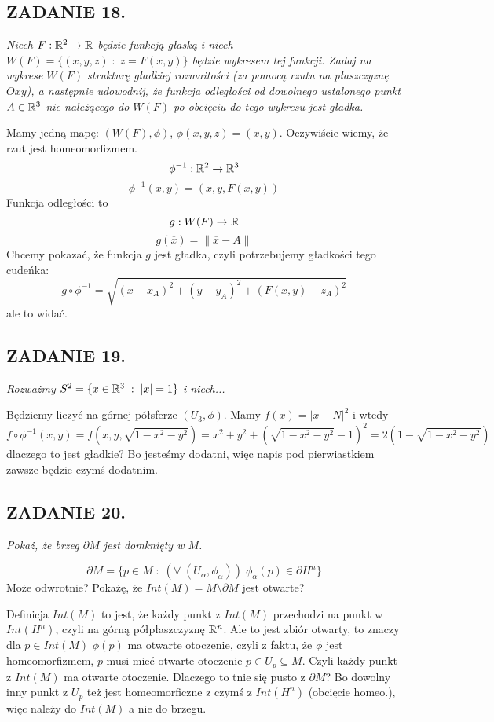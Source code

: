 \subsection*{ZADANIE 18.}
\emph{\color{pink}Niech $F:\mathbb{R}^2\to\mathbb{R}$ będzie funkcją głaską i niech $W(F)=\{(x, y,z)\;:\;z=F(x,y)\}$ będzie wykresem tej funkcji. Zadaj na wykrese $W(F)$ strukturę gładkiej rozmaitości (za pomocą rzutu na płaszczyznę $Oxy$), a następnie udowodnij, że funkcja odległości od dowolnego ustalonego punkt $A\in\mathbb{R}^3$ nie należącego do $W(F)$ po obcięciu do tego wykresu jest gładka.}
\smallskip

Mamy jedną mapę: $(W(F),\phi)$, $\phi(x,y,z)=(x,y)$. Oczywiście wiemy, że rzut jest homeomorfizmem.
$$\phi^{-1}:\mathbb{R}^2\to \mathbb{R}^3$$
$$\phi^{-1}(x,y)=(x,y,F(x,y))$$
Funkcja odległości to
$$g:W(F)\to\mathbb{R}$$
$$g(\overline x)=\|\overline x-A\|$$
Chcemy pokazać, że funkcja $g$ jest gładka, czyli potrzebujemy gładkości tego cudeńka:
$$g\circ \phi^{-1}=\sqrt{(x-x_A)^2+(y-y_A)^2+(F(x,y)-z_A)^2}$$
ale to widać.

\subsection*{ZADANIE 19.}
\emph{\color{pink}Rozważmy $S^2=\{x\in\mathbb{R}^3\;:\;|x|=1\}$ i niech...}
\smallskip

Będziemy liczyć na górnej półsferze $(U_3,\phi)$. Mamy $f(x)=|x-N|^2$ i wtedy
$$f\circ\phi^{-1}(x, y)=f(x, y, \sqrt{1-x^2-y^2})=x^2+y^2+(\sqrt{1-x^2-y^2}-1)^2=2(1-\sqrt{1-x^2-y^2})$$
dlaczego to jest gładkie? Bo jesteśmy dodatni, więc napis pod pierwiastkiem zawsze będzie czymś dodatnim.

\subsection*{ZADANIE 20.}
\emph{\color{pink}Pokaż, że brzeg $\partial M$ jest domknięty w $M$.}
\smallskip

$$\partial M=\{p\in M\;:\;(\forall\;(U_\alpha, \phi_\alpha))\;\phi_\alpha(p)\in\partial H^n\}$$
Może odwrotnie? Pokażę, że $Int(M)=M\setminus\partial M$ jest otwarte?

Definicja $Int(M)$ to jest, że każdy punkt z $Int(M)$ przechodzi na punkt w $Int(H^n)$, czyli na górną półpłaszczyznę $\mathbb{R}^n$. Ale to jest zbiór otwarty, to znaczy dla $p\in Int(M)$ $\phi(p)$ ma otwarte otoczenie, czyli z faktu, że $\phi$ jest homeomorfizmem, $p$ musi mieć otwarte otoczenie $p\in U_p\subseteq M$. Czyli każdy punkt z $Int(M)$ ma otwarte otoczenie. Dlaczego to tnie się pusto z $\partial M$? Bo dowolny inny punkt z $U_p$ też jest homeomorficzne z czymś z $Int(H^n)$ (obcięcie homeo.), więc należy do $Int(M)$ a nie do brzegu.


